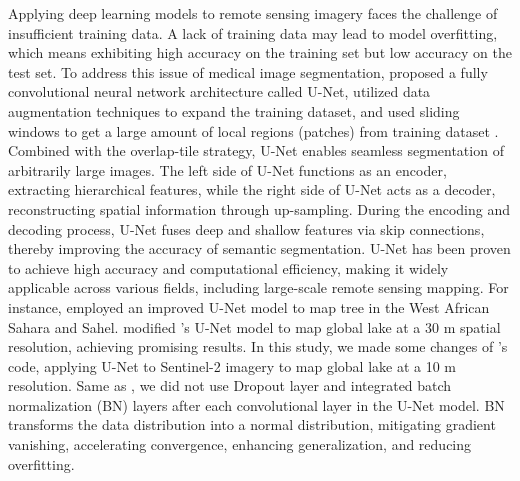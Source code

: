 \documentclass[preprint,12pt,authoryear]{elsarticle}
\begin{document}
Applying deep learning models to remote sensing imagery faces the challenge of insufficient training data. A lack of training data may lead to model overfitting, which means exhibiting high accuracy on the training set but low accuracy on the test set. To address this issue of medical image segmentation, \citet{ronneberger_u-net_2015} proposed a fully convolutional neural network architecture called U-Net, utilized data augmentation techniques to expand the training dataset, and used sliding windows to get a large amount of local regions (patches) from training dataset \citep{ronneberger_u-net_2015}.  Combined with the overlap-tile strategy, U-Net enables seamless segmentation of arbitrarily large images. The left side of U-Net functions as an encoder, extracting hierarchical features, while the right side of U-Net acts as a decoder, reconstructing spatial information through up-sampling. During the encoding and decoding process, U-Net fuses deep and shallow features via skip connections, thereby improving the accuracy of semantic segmentation. U-Net has been proven to achieve high accuracy and computational efficiency, making it widely applicable across various fields, including large-scale remote sensing mapping. For instance, \citet{brandt_unexpectedly_2020} employed an improved U-Net model to map tree in the West African Sahara and Sahel. \citet{pi_mapping_2022} modified \citep{brandt_unexpectedly_2020}'s U-Net model to map global lake at a 30 m spatial resolution, achieving promising results. In this study, we made some changes of \citet{pi_mapping_2022}'s code, applying U-Net to Sentinel-2 imagery to map global lake at a 10 m resolution. Same as \citet{pi_mapping_2022}, we did not use Dropout layer and integrated batch normalization (BN) layers \citep{ioffe_batch_2015} after each convolutional layer in the U-Net model. BN transforms the data distribution into a normal distribution, mitigating gradient vanishing, accelerating convergence, enhancing generalization, and reducing overfitting.
\end{document}
